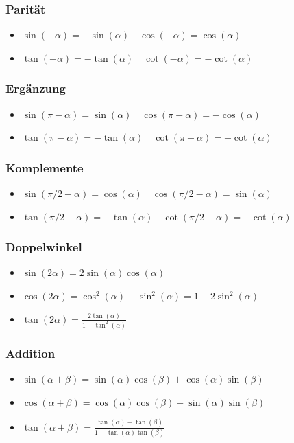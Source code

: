 \documentclass[7pt,landscape, margin = 0.1mm]{article}
\begin{document}
\begin{multicols}{4}
\begin{itemize}
\end{itemize}

\subsubsection{Parität}
\begin{itemize}
 \item $\sin(-\alpha) = - \sin(\alpha) \quad \cos(-\alpha) = \cos(\alpha)$
 \item $\tan(-\alpha) = - \tan(\alpha) \quad \cot(-\alpha) = - \cot(\alpha)$
\end{itemize}

\subsubsection{Ergänzung}
\begin{itemize}
 \item $\sin(\pi - \alpha) = \sin(\alpha) \quad \cos(\pi - \alpha) = - \cos(\alpha)$
 \item $\tan(\pi - \alpha) = -\tan(\alpha) \quad \cot(\pi - \alpha) = - \cot(\alpha)$
\end{itemize}


\subsubsection{Komplemente}
\begin{itemize}
 \item $\sin(\pi/2 - \alpha) = \cos(\alpha) \quad \cos(\pi/2 - \alpha) = \sin(\alpha)$
 \item $\tan(\pi/2 - \alpha) = -\tan(\alpha) \quad \cot(\pi/2 - \alpha) = -\cot(\alpha)$
\end{itemize}

\subsubsection{Doppelwinkel}
\begin{itemize}
 \item $\sin(2\alpha) = 2 \sin(\alpha) \cos(\alpha)$
 \item $\cos(2\alpha) = \cos^2(\alpha) - \sin^2(\alpha) = 1 - 2 \sin^2(\alpha)$
 \item $\tan(2\alpha) = \frac{2\tan(\alpha)}{1 - \tan^2(\alpha)}$
\end{itemize}

\subsubsection{Addition}
\begin{itemize}
 \item $\sin(\alpha + \beta) = \sin(\alpha) \cos(\beta) + \cos(\alpha) \sin(\beta)$
 \item $\cos(\alpha + \beta) = \cos(\alpha) \cos(\beta) - \sin(\alpha) \sin(\beta)$
 \item $\tan(\alpha + \beta) = \frac{\tan(\alpha) + \tan(\beta)}{1 - \tan(\alpha) \tan(\beta)}$
\end{itemize}


\end{multicols}
\end{document}
